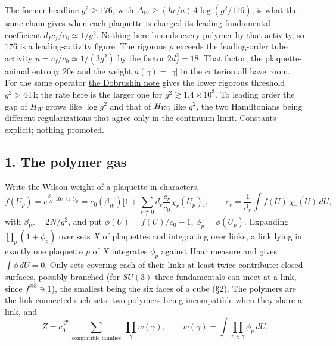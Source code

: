 \documentclass[11pt,a4paper]{article}
\begin{document}
The former headline \(g^2\ge176\), with
\(\Delta_W\ge(\hbar c/a)\,4\log(g^2/176)\), is what the same chain gives
when each plaquette is charged its leading fundamental coefficient
\(d_fc_f/c_0\simeq1/g^2\). Nothing here bounds every polymer by that
activity, so \(176\) is a leading-activity figure. The rigorous \(\rho\)
exceeds the leading-order tube activity \(u=c_f/c_0\simeq1/(3g^2)\) by
the factor \(2d_f^2=18\). That factor, the plaquette-animal entropy
\(20e\) and the weight \(a(\gamma)=|\gamma|\) in the criterion all have
room. For the same operator \href{dobrushin-uniqueness-wilson.md}{the
Dobrushin note} gives the lower rigorous threshold \(g^2>444\); the rate
here is the larger one for \(g^2\gtrsim1.4\times10^3\). To leading order
the gap of \(H_W\) grows like \(\log g^2\) and that of \(H_{\rm KS}\)
like \(g^2\), the two Hamiltonians being different regularizations that
agree only in the continuum limit. Constants explicit; nothing promoted.

\hypertarget{the-polymer-gas}{%
\subsection{1. The polymer gas}\label{the-polymer-gas}}

Write the Wilson weight of a plaquette in characters,
\[f(U_p)=e^{\frac{\beta_W}{N}\operatorname{Re}\operatorname{tr}U_p}
=c_0(\beta_W)\Big[1+\sum_{r\ne0}d_r\frac{c_r}{c_0}\chi_r(U_p)\Big],
\qquad c_r=\frac1{d_r}\int f(U)\,\overline{\chi_r(U)}\,dU ,\] with
\(\beta_W=2N/g^2\), and put \(\phi(U)=f(U)/c_0-1\),
\(\phi_p=\phi(U_p)\). Expanding \(\prod_p(1+\phi_p)\) over sets \(X\) of
plaquettes and integrating over links, a link lying in exactly one
plaquette \(p\) of \(X\) integrates \(\phi_p\) against Haar measure and
gives \(\int\phi\,dU=0\). Only sets covering each of their links at
least twice contribute: closed surfaces, possibly branched (for
\(SU(3)\) three fundamentals can meet at a link, since
\(f^{\otimes3}\ni1\)), the smallest being the six faces of a cube (§2).
The polymers are the link-connected such sets, two polymers being
incompatible when they share a link, and
\[Z=c_0^{|\mathcal P|}\sum_{\text{compatible families}}\ \prod_\gamma w(\gamma),
\qquad w(\gamma)=\int\prod_{p\in\gamma}\phi_p\,dU .\]
\end{document}
